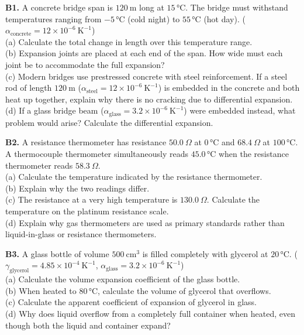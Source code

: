 \begin{exercisebox}[13]
\textbf{B1.} A concrete bridge span is $120\ \text{m}$
long at $15\,°\text{C}$. The bridge must withstand
temperatures ranging from $-5\,°\text{C}$ (cold night)
to $55\,°\text{C}$ (hot day).
($\alpha_{\text{concrete}} = 12\times10^{-6}\ \text{K}^{-1}$)\\[4pt]
(a) Calculate the total change in length over this
temperature range.\\
(b) Expansion joints are placed at each end of the
span. How wide must each joint be to accommodate the
full expansion?\\
(c) Modern bridges use prestressed concrete with
steel reinforcement. If a steel rod of length
$120\ \text{m}$
($\alpha_{\text{steel}} = 12\times10^{-6}\ \text{K}^{-1}$)
is embedded in the concrete and both heat up together,
explain why there is no cracking due to differential
expansion.\\
(d) If a glass bridge beam ($\alpha_{\text{glass}}
= 3.2\times10^{-6}\ \text{K}^{-1}$) were embedded
instead, what problem would arise? Calculate the
differential expansion.
\hfill{}

\vspace{0.4cm}

\textbf{B2.} A resistance thermometer has resistance
$50.0\ \Omega$ at $0\,°\text{C}$ and $68.4\ \Omega$
at $100\,°\text{C}$.
A thermocouple thermometer simultaneously reads
$45.0\,°\text{C}$ when the resistance thermometer
reads $58.3\ \Omega$.\\[4pt]
(a) Calculate the temperature indicated by the
resistance thermometer.\\
(b) Explain why the two readings differ.\\
(c) The resistance at a very high temperature is
$130.0\ \Omega$. Calculate the temperature on the
platinum resistance scale.\\
(d) Explain why gas thermometers are used as
primary standards rather than liquid-in-glass or
resistance thermometers.
\hfill{}

\vspace{0.4cm}

\textbf{B3.} A glass bottle of volume
$500\ \text{cm}^3$ is filled completely with
glycerol at $20\,°\text{C}$.
($\gamma_{\text{glycerol}} = 4.85\times10^{-4}\ \text{K}^{-1}$,
$\alpha_{\text{glass}} = 3.2\times10^{-6}\ \text{K}^{-1}$)\\[4pt]
(a) Calculate the volume expansion coefficient of
the glass bottle.\\
(b) When heated to $80\,°\text{C}$, calculate the
volume of glycerol that overflows.\\
(c) Calculate the apparent coefficient of expansion
of glycerol in glass.\\
(d) Why does liquid overflow from a completely full
container when heated, even though both the liquid
and container expand?
\hfill{}


\end{exercisebox}
